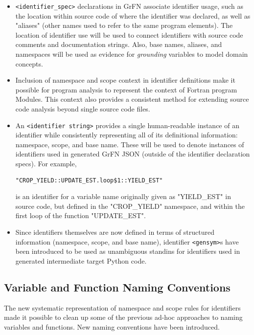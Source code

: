 \documentclass[article, 12pt, oneside]{memoir}
\begin{document}
\begin{itemize}
\item
  \texttt{\textless{}identifier\_spec\textgreater{}} declarations in
  GrFN associate identifier usage, such as the location within source
  code of where the identifier was declared, as well as "aliases" (other
  names used to refer to the same program elements). The location of
  identifier use will be used to connect identifiers with source code
  comments and documentation strings. Also, base names, aliases, and
  namespaces will be used as evidence for \emph{grounding} variables to
  model domain concepts.
\item
  Inclusion of namespace and scope context in identifier definitions
  make it possible for program analysis to represent the context of
  Fortran program Modules. This context also provides a consistent
  method for extending source code analysis beyond single source code
  files.
\item
  An \texttt{\textless{}identifier\ string\textgreater{}} provides a
  single human-readable instance of an identifier while consistently
  representing all of its definitional information: namespace, scope,
  and base name. These will be used to denote instances of identifiers
  used in generated GrFN JSON (outside of the identifier declaration
  specs). For example,

\begin{verbatim}
"CROP_YIELD::UPDATE_EST.loop$1::YIELD_EST"
\end{verbatim}

  is an identifier for a variable name originally given as "YIELD\_EST"
  in source code, but defined in the "CROP\_YIELD" namespace, and within
  the first loop of the function "UPDATE\_EST".
\item
  Since identifiers themselves are now defined in terms of structured
  information (namespace, scope, and base name), identifier
  \texttt{\textless{}gensym\textgreater{}}s have been introduced to be
  used as unambiguous standins for identifiers used in generated
  intermediate target Python code.
\end{itemize}

\hypertarget{variable-and-function-naming-conventions}{%
\subsection{Variable and Function Naming
Conventions}\label{variable-and-function-naming-conventions}}

The new systematic representation of namespace and scope rules for
identifiers made it possible to clean up some of the previous ad-hoc
approaches to naming variables and functions. New naming conventions
have been introduced.
\end{document}
